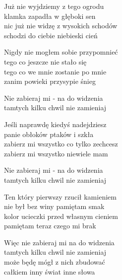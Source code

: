 \begin{text}
    Już nie wyjdziemy z tego ogrodu\\
    klamka zapadła w głęboki sen\\
    nic już nie widzę z wysokich schodów\\
    schodzi do ciebie niebieski cień

    Nigdy nie mogłem sobie przypomnieć\\
    tego co jeszcze nie stało się\\
    tego co we mnie zostanie po mnie\\
    zanim powieki przysypie śnieg

    Nie zabieraj mi - na do widzenia\\
    tamtych kilku chwil nie zamieniaj

    Jeśli naprawdę kiedyś nadejdziesz\\
    panie obłoków ptaków i szkła\\
    zabierz mi wszystko co tylko zechcesz\\
    zabierz mi wszystko niewiele mam

    Nie zabieraj mi - na do widzenia\\
    tamtych kilku chwil nie zamieniaj

    Ten który pierwszy rzucił kamieniem\\
    nie był bez winy pamiętam smak\\
    kolor ucieczki przed własnym cieniem\\
    pamiętam teraz czego mi brak

    Więc nie zabieraj mi na do widzenia\\
    tamtych kilku chwil nie zamieniaj\\
    może będę mógł z nich zbudować\\
    całkiem inny świat inne słowa
\end{text}
\begin{chord}

\end{chord}